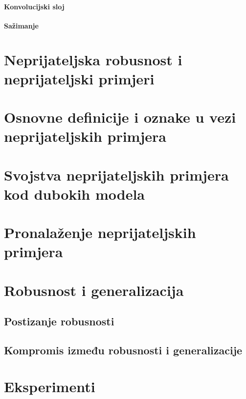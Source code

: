 \documentclass[oneside]{book}
\begin{document}
\paragraph{Konvolucijski sloj}

\paragraph{Sažimanje}



\section{Neprijateljska robusnost i neprijateljski primjeri}



\section{Osnovne definicije i oznake u vezi neprijateljskih primjera}



\section{Svojstva neprijateljskih primjera kod dubokih modela}



\section{Pronalaženje neprijateljskih primjera}



\section{Robusnost i generalizacija}


\subsection{Postizanje robusnosti}


\subsection{Kompromis između robusnosti i generalizacije}



\section{Eksperimenti}
\end{document}

